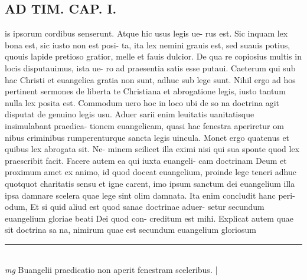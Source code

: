 \documentclass{article}
\begin{document}
\begin{pages}
\section*{AD TIM. CAP. I. }
\marginpar{[ p.101 ]}\pstart is ipsorum cordibus senserunt. Atque hic usus legis ue- rus est. Sic inquam lex bona est, sic iusto non est posi- ta, ita lex nemini grauis est, sed suauis potius, quouis lapide pretioso gratior, melle et fauis dulcior. De qua re copiosius multis in locis disputauimus, ista ue- ro ad praesentia satis esse putaui. Caeterum qui sub hac Christi et euangelica gratia non sunt, adhuc sub lege sunt. Nihil ergo ad hos pertinent sermones de liberta te Christiana et abrogatione legis, iusto tantum nulla lex posita est. Commodum uero hoc in loco ubi de so na doctrina agit disputat de genuino legis usu. Aduer sarii enim leuitatis uanitatisque insimulabant praedica- tionem euangelicam, quasi hac fenestra aperiretur om nibus criminibus rumperenturque sancta legis uincula. Monet ergo quatenus et quibus lex abrogata sit. Ne- minem scilicet illa eximi nisi qui sua sponte quod lex praescribit facit. Facere autem ea qui iuxta euangeli- cam doctrinam Deum et proximum amet ex animo, id quod doceat euangelium, proinde lege teneri adhuc quotquot charitatis sensu et igne carent, imo ipsum sanctum dei euangelium illa ipsa damnare scelera quae lege sint olim damnata. Ita enim concludit hanc peri- odum, Et si quid aliud est quod sanae doctrinae aduer- setur secundum euangelium gloriae beati Dei quod con- creditum est mihi. Explicat autem quae sit doctrina sa na, nimirum quae est secundum euangelium gloriosum  \pend
\vspace{0.5cm}\noindent
\vspace{0.2cm}\rule{1cm}{0.2pt}\\ 
\hspace{0.2cm}\textit{mg}
\footnotesize Buangelii praedicatio non aperit fenestram sceleribus. 
\normalsize| 

\end{pages}
\end{document}
